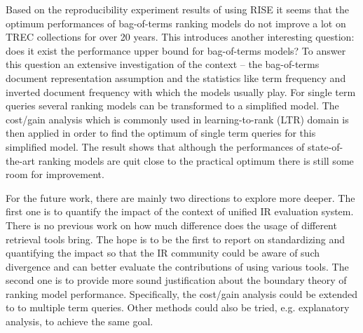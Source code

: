 Based on the reproducibility experiment results of using RISE it seems that 
the optimum performances of bag-of-terms ranking models do not improve a lot 
on TREC collections for over 20 years. 
This introduces another interesting question: does it exist the performance 
upper bound for bag-of-terms models? To answer this question an extensive 
investigation of the context -- the bag-of-terms document representation 
assumption and the statistics like term frequency and inverted document 
frequency with which the models usually play.
For single term queries several ranking models can be transformed to a 
simplified model. The cost/gain analysis which is commonly used in 
learning-to-rank (LTR) domain is then applied in order to find the optimum 
of single term queries for this simplified model.
The result shows that although the performances of state-of-the-art 
ranking models are quit close to the practical optimum there is still some 
room for improvement.

For the future work, there are mainly two directions to explore more deeper. 
The first one is to quantify the impact of the context of unified 
IR evaluation system. There is no previous work on how much difference does 
the usage of different retrieval tools bring.
The hope is to be the first to report on standardizing and quantifying the 
impact so that the IR community could be aware of such divergence and can 
better evaluate the contributions of using various tools. 
The second one is to provide more sound justification about the boundary 
theory of ranking model performance. Specifically, the cost/gain 
analysis could be extended to to multiple term queries. 
Other methods could also be tried, e.g. explanatory analysis, to achieve 
the same goal.
